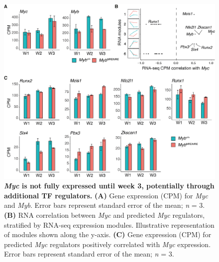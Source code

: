 \begin{figure}[!t]
    \centering
    \includegraphics[width=\textwidth,height=\textheight,keepaspectratio]{figures/chapter5/ch5_myc-regulation.png}
    \caption[{\textit{Myc} is not fully expressed until week 3, potentially through additional TF regulators.}]
    {\textbf{\textit{Myc} is not fully expressed until week 3, potentially through additional TF regulators.}
    \textbf{(A)} Gene expression (CPM) for \textit{Myc} and \textit{Myb}. Error bars represent standard error of the mean; \textit{n} = 3. 
    \textbf{(B)} RNA correlation between \textit{Myc} and predicted \textit{Myc} regulators, stratified by RNA-seq expression modules. Illustrative representation of modules shown along the y-axis. 
    \textbf{(C)} Gene expression (CPM) for predicted \textit{Myc} regulators positively correlated with \textit{Myc} expression. Error bars represent standard error of the mean; \textit{n} = 3.
    }
    \label{fig:ch5_myc-regulation}
\end{figure}


